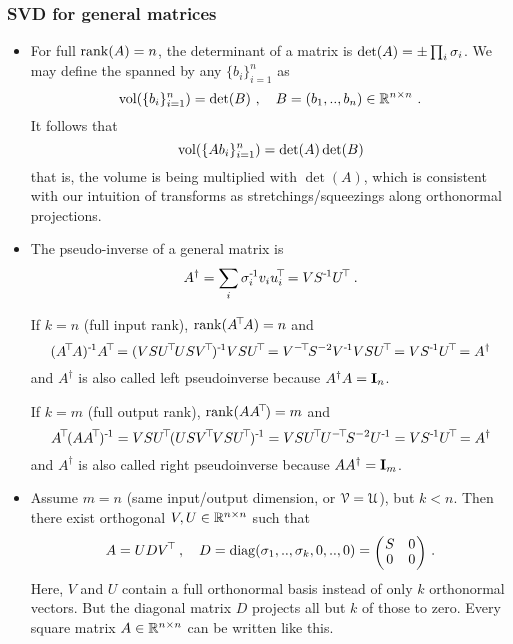 \subsubsection{SVD for general matrices}

\begin{itemize}
\item For full ${\rm rank}(A)=n$, the determinant of a matrix is $\det(A)
= \pm \prod_i \sigma_i$. We may define the  spanned by any
$\{b_i\}_{i=1}^n$ as
\begin{equation}
\operatorname{vol}(\{b_i\}_{i=1}^n) = \det(B) ~,\quad
B=(b_1,..,b_n)\in{\mathbb{R}}^{n\times n} ~.
\end{equation}
It follows that
\begin{equation}
\operatorname{vol}(\{A b_i\}_{i=1}^n) = \det(A) \det(B)
\end{equation}
that is, the volume is
being multiplied with $\det(A)$, which is consistent with our
intuition of transforms as stretchings/squeezings along
orthonormal projections.

\item The pseudo-inverse of a general matrix is
\begin{equation}
A^\dagger = \sum_i \sigma_i^{{\hspace*{-.0pt}\text{\rm -}\hspace*{-.5pt}}1} v_i u_i^{\!\top\!} = V S^{{\hspace*{-.0pt}\text{\rm -}\hspace*{-.5pt}}1} U^{\!\top\!} ~.
\end{equation}

If $k=n$ (full input rank), ${\rm rank}(A^{\!\top\!} A) = n$ and
\begin{equation}
(A^\T A)^\1 A^\T = (V S U^\T U S V^\T)^\1 V S U^\T
 = V^{-\T} S^{-2} V^\1 V S U^\T
 = V S^\1 U^\T = A^\dagger
\end{equation}
and $A^\dagger$ is also called left pseudoinverse because $A^\dagger A
 = {\rm\bf I}_n$.

If $k=m$ (full output rank), ${\rm rank}(A A^{\!\top\!}) = m$ and
\begin{equation}
A^\T (A A^\T)^\1 = V S U^\T (U S V^\T V S U^\T )^\1 
 = V S U^\T U^{-\T} S^{-2} U^\1
 = V S^\1 U^\T = A^\dagger
\end{equation}
and $A^\dagger$ is also called right pseudoinverse because $A A^\dagger = {\rm\bf I}_m$.

\item Assume $m=n$ (same input/output dimension, or ${\cal V}={\cal U}$), but
 $k<n$. Then there exist orthogonal $V, U \in {\mathbb{R}}^{n\times n}$ such that
\begin{equation}
A = U D V^\T \comma D = \diag(\s_1,..,\s_k,0,..,0) = \mat{cc}{S & 0
\\ 0 & 0} ~. 
\end{equation}
Here, $V$ and $U$ contain a full orthonormal basis instead of only $k$
orthonormal vectors. But the diagonal matrix $D$ projects all but $k$
of those to zero. Every square matrix $A\in{\mathbb{R}}^{n\times n}$ can be
written like this.
\end{itemize}

